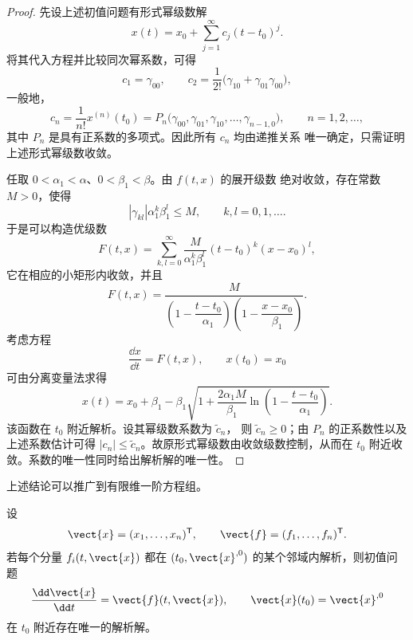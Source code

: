 \begin{proof}
	先设上述初值问题有形式幂级数解
	\[
		x(t)=x_0+\sum_{j=1}^{\infty}c_j(t-t_0)^j.
	\]
	将其代入方程并比较同次幂系数，可得
	\[
		c_1=\gamma_{00},
		\qquad
		c_2=\dfrac{1}{2!}
		\bigl(\gamma_{10}+\gamma_{01}\gamma_{00}\bigr),
	\]
	一般地，
	\[
		c_n=\dfrac{1}{n!}x^{(n)}(t_0)
		=P_n\bigl(\gamma_{00},\gamma_{01},\gamma_{10},
		\ldots,\gamma_{n-1,0}\bigr),
		\qquad n=1,2,\ldots,
	\]
	其中 $P_n$ 是具有正系数的多项式。因此所有 $c_n$ 均由递推关系
	唯一确定，只需证明上述形式幂级数收敛。

	任取 $0<\alpha_1<\alpha$、$0<\beta_1<\beta$。由 $f(t,x)$ 的展开级数
	绝对收敛，存在常数 $M>0$，使得
	\[
		|\gamma_{kl}|\alpha_1^k\beta_1^l\leq M,
		\qquad k,l=0,1,\ldots.
	\]
	于是可以构造优级数
	\[
		F(t,x)=\sum_{k,l=0}^{\infty}
		\dfrac{M}{\alpha_1^k\beta_1^l}
		(t-t_0)^k(x-x_0)^l,
	\]
	它在相应的小矩形内收敛，并且
	\[
		F(t,x)=
		\dfrac{M}
		{\left(1-\dfrac{t-t_0}{\alpha_1}\right)
		 \left(1-\dfrac{x-x_0}{\beta_1}\right)}.
	\]
	考虑方程
	\[
		\dfrac{\dd x}{\dd t}=F(t,x),
		\qquad x(t_0)=x_0
	\]
	可由分离变量法求得
	\[
		x(t)=x_0+\beta_1-\beta_1
		\sqrt{1+\dfrac{2\alpha_1M}{\beta_1}
		\ln\left(1-\dfrac{t-t_0}{\alpha_1}\right)}.
	\]
	该函数在 $t_0$ 附近解析。设其幂级数系数为 $\widetilde c_n$，
	则 $\widetilde c_n\geq 0$；由 $P_n$ 的正系数性以及上述系数估计可得
	$|c_n|\leq\widetilde c_n$。故原形式幂级数由收敛级数控制，从而在
	$t_0$ 附近收敛。系数的唯一性同时给出解析解的唯一性。
\end{proof}

上述结论可以推广到有限维一阶方程组。

\begin{corollary}\label{prop:Cauchy定理的有限维推广}
	设
	\[
		\vect{x}=(x_1,\ldots,x_n)^{\mathsf T},
		\qquad
		\vect{f}=(f_1,\ldots,f_n)^{\mathsf T}.
	\]
	若每个分量 $f_i(t,\vect{x})$ 都在
	$(t_0,\vect{x}^{,0})$ 的某个邻域内解析，则初值问题
	\[
		\dfrac{\dd\vect{x}}{\dd t}=\vect{f}(t,\vect{x}),
		\qquad
		\vect{x}(t_0)=\vect{x}^{,0}
	\]
	在 $t_0$ 附近存在唯一的解析解。
\end{corollary}

